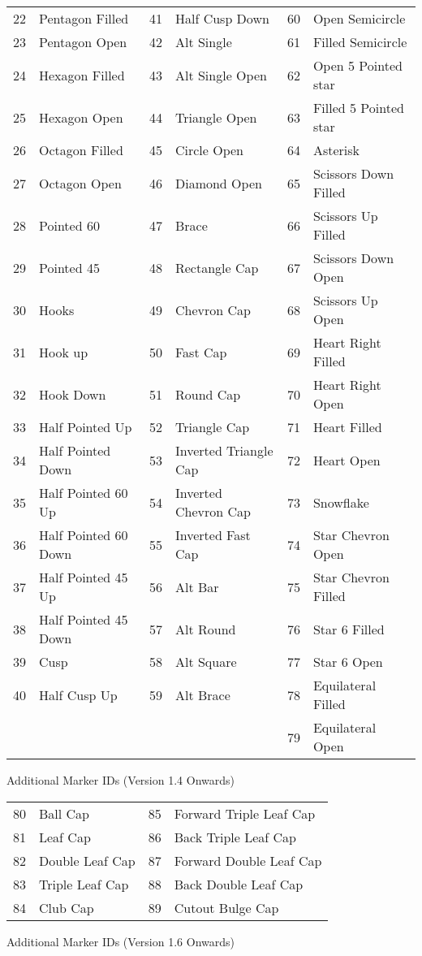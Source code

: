 \begin{numbered}
\begin{enumerate}
\begin{enumerate}
{%
  \begin{tabular}{llllll}
  22 & Pentagon Filled & 41 & Half Cusp Down & 60 & Open Semicircle\\
  23 & Pentagon Open & 42 & Alt Single & 61 & Filled Semicircle \\
  24 & Hexagon Filled & 43 & Alt Single Open & 62 & Open 5 Pointed star\\
  25 & Hexagon Open & 44 & Triangle Open & 63 & Filled 5 Pointed star\\
  26 & Octagon Filled & 45 & Circle Open & 64 & Asterisk\\
  27 & Octagon Open & 46 & Diamond Open & 65 & Scissors Down Filled\\
  28 & Pointed 60 & 47 & Brace & 66 & Scissors Up Filled\\
  29 & Pointed 45 & 48 & Rectangle Cap & 67 & Scissors Down Open\\
  30 & Hooks & 49 & Chevron Cap & 68 & Scissors Up Open\\
  31 & Hook up & 50 & Fast Cap & 69 & Heart Right Filled\\
  32 & Hook Down & 51 & Round Cap & 70 & Heart Right Open\\
  33 & Half Pointed Up & 52 & Triangle Cap & 71 & Heart Filled\\
  34 & Half Pointed Down & 53 & Inverted Triangle Cap & 72 & Heart Open\\
  35 & Half Pointed 60 Up & 54 & Inverted Chevron Cap & 73 & Snowflake\\
  36 & Half Pointed 60 Down & 55 & Inverted Fast Cap & 74 & Star Chevron Open\\
  37 & Half Pointed 45 Up & 56 & Alt Bar & 75 & Star Chevron Filled\\
  38 & Half Pointed 45 Down & 57 & Alt Round & 76 & Star 6 Filled\\
  39 & Cusp & 58 & Alt Square & 77 & Star 6 Open\\
  40 & Half Cusp Up & 59 & Alt Brace & 78 & Equilateral Filled\\
   & & & & 79 & Equilateral Open
  \end{tabular}
}
{Additional Marker IDs (Version 1.4 Onwards)}

{%
  \begin{tabular}{llll}
  80 & Ball Cap & 85 & Forward Triple Leaf Cap \\
  81 & Leaf Cap & 86 & Back Triple Leaf Cap \\
  82 & Double Leaf Cap & 87 & Forward Double Leaf Cap \\
  83 & Triple Leaf Cap & 88 & Back Double Leaf Cap \\
  84 & Club Cap & 89 & Cutout Bulge Cap
  \end{tabular}
}
{Additional Marker IDs (Version 1.6 Onwards)}



\end{enumerate}
\end{enumerate}
\end{numbered}
